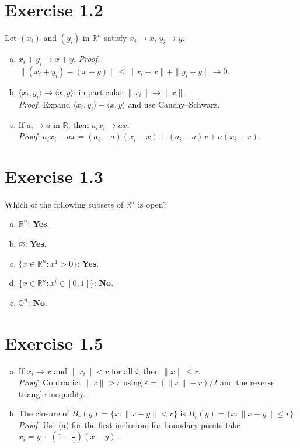 \documentclass[11pt,a4paper]{article}
\begin{document}
\section*{Exercise 1.2}
Let $(x_i)$ and $(y_i)$ in $\mathbb{R}^n$ satisfy $x_i\to x$, $y_i\to y$.
\begin{enumerate}[a)]
\item $x_i+y_i\to x+y$. \textit{Proof.} $\|(x_i+y_i)-(x+y)\|\le \|x_i-x\|+\|y_i-y\|\to 0$.
\item $\langle x_i,y_i\rangle\to \langle x,y\rangle$; in particular $\|x_i\|\to \|x\|$.\\
\textit{Proof.} Expand $\langle x_i,y_i\rangle-\langle x,y\rangle$ and use Cauchy--Schwarz.
\item If $a_i\to a$ in $\mathbb{R}$, then $a_i x_i\to ax$.\\
\textit{Proof.} $a_ix_i-ax=(a_i-a)(x_i-x)+(a_i-a)x+a(x_i-x)$.
\end{enumerate}

\section*{Exercise 1.3}
Which of the following subsets of $\mathbb{R}^n$ is open?
\begin{enumerate}[a)]
\item $\mathbb{R}^n$: \textbf{Yes}.
\item $\varnothing$: \textbf{Yes}.
\item $\{x\in\mathbb{R}^n:x^1>0\}$: \textbf{Yes}.
\item $\{x\in\mathbb{R}^n:x^i\in[0,1]\}$: \textbf{No}.
\item $\mathbb{Q}^n$: \textbf{No}.
\end{enumerate}

\section*{Exercise 1.5}
\begin{enumerate}[a)]
\item If $x_i\to x$ and $\|x_i\|<r$ for all $i$, then $\|x\|\le r$.\\
\textit{Proof.} Contradict $\|x\|>r$ using $\varepsilon=(\|x\|-r)/2$ and the reverse triangle inequality.
\item The closure of $B_r(y)=\{x:\|x-y\|<r\}$ is $\overline{B_r(y)}=\{x:\|x-y\|\le r\}$.\\
\textit{Proof.} Use (a) for the first inclusion; for boundary points take $x_i=y+(1-\tfrac1i)(x-y)$.
\end{enumerate}
\end{document}
